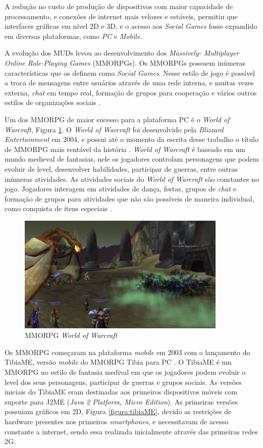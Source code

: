 A redução no custo de produção de dispositivos com maior capacidade de processamento, e conexões de internet mais velozes e estáveis, permitiu que interfaces gráficas em nível 2D e 3D, e o acesso aos \textit{Social Games} fosse expandido em diversas plataformas, como \textit{PC} e \textit{Mobile}.

A evolução dos MUDs levou ao desenvolvimento dos \textit{Massively- Multiplayer Online Role-Playing Games} (MMORPGs). Os MMORPGs possuem inúmeras características que os definem como \textit{Social Games}. Nesse estilo de jogo é possível a troca de mensagens entre usuários através de uma rede interna, e muitas vezes externa, \textit{chat} em tempo real, formação de grupos para cooperação e vários outros estilos de organizações sociais \cite{fields2014}.

Um dos MMORPG de maior sucesso para a plataforma PC é o \textit{World of Warcraft}, Figura \ref{figura:wow}. O \textit{World of Warcraft} foi desenvolvido pela \textit{Blizzard Entertainment} em 2004, e possui até o momento da escrita desse trabalho o título de MMORPG mais rentável da história \cite{thurau2010} \cite{omer2015}. \textit{World of Warcraft} é baseado em um mundo medieval de fantasias, nele os jogadores controlam personagens que podem evoluir de level, desenvolver habilidades, participar de guerras, entre outras inúmeras atividades. As atividades sociais do \textit{World of Warcraft} são constantes no jogo. Jogadores interagem em atividades de dança, festas, grupos de \textit{chat} e formação de grupos para atividades que não são possíveis de maneira individual, como conquista de itens especiais \cite{thurau2010} \cite{nardi2006}.

\begin{figure}[h]
  \centering
  \includegraphics[width=10cm]{figuras/wow.jpg}
  \caption{MMORPG \textit{World of Warcraft} \cite{kotaku}}
  \label{figura:wow}
\end{figure}

Os MMORPG começaram na plataforma \textit{mobile} em 2003 com o lançamento do TibiaME, versão \textit{mobile} do MMORPG Tibia para PC \cite{tibiaME}. O TibiaME é um MMORPG no estilo de fantasia medival em que os jogadores podem evoluir o level dos seus personagens, participar de guerras e grupos sociais. As versões iniciais do TibiaME eram destinadas aos primeiros dispositivos móveis com suporte para J2ME (\textit{Java 2 Platform, Micro Edition}). As primeiras versões possuiam gráficos em 2D, Figura \ref{figura:tibiaME}, devido as restrições de hardware presentes nos primeiros \textit{smartphones}, e necessitavam de acesso constante a internet, sendo essa realizada inicialmente através das primeiras redes 2G.

